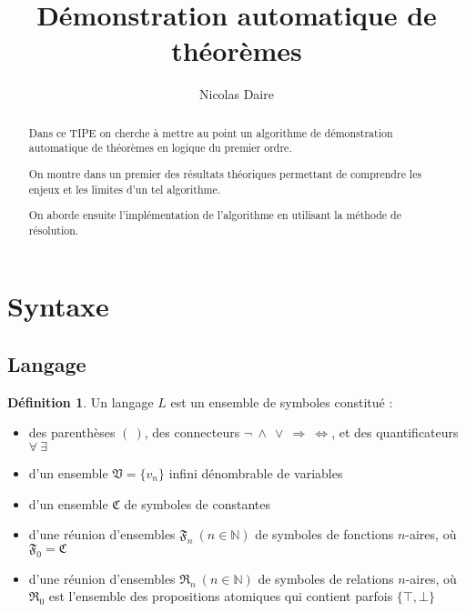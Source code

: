 \documentclass[a4paper]{article}
\title{Démonstration automatique de théorèmes}
\author{Nicolas Daire}
\date{}
\begin{document}
\maketitle

\begin{abstract}
  Dans ce TIPE on cherche à mettre au point un algorithme de démonstration automatique de théorèmes en logique du premier ordre.

  On montre dans un premier des résultats théoriques permettant de comprendre les enjeux et les limites d'un tel algorithme.

  On aborde ensuite l'implémentation de l'algorithme en utilisant la méthode de résolution.
\end{abstract}


\theoremstyle{definition}
\newtheorem{definition}{Définition}[section]

\theoremstyle{plain}
\newtheorem{theorem}{Théorème}[section]

\theoremstyle{plain}
\newtheorem{corollary}{Corollaire}[theorem]

\theoremstyle{plain}
\newtheorem{lemma}[theorem]{Lemme}

\theoremstyle{remark}
\newtheorem*{remark}{Remarque}

\section{Syntaxe}

\subsection{Langage}

\begin{definition}
  Un langage $L$ est un ensemble de symboles constitué :
  \begin{itemize}
  \item des parenthèses $(\ )$, des connecteurs $\neg\ \wedge\ \vee\ \Rightarrow\ \Leftrightarrow$, et des quantificateurs $\forall\ \exists$
  \item d'un ensemble $\mathfrak{V} = \{v_n\}$ infini dénombrable de variables
  \item d'un ensemble $\mathfrak{C}$ de symboles de constantes
  \item d'une réunion d'ensembles $\mathfrak{F}_n\ (n \in \mathbb{N})$ de symboles de fonctions $n$-aires, où $\mathfrak{F}_0 = \mathfrak{C}$
  \item d'une réunion d'ensembles $\mathfrak{R}_n\ (n \in \mathbb{N})$ de symboles de relations $n$-aires, où $\mathfrak{R}_0$ est l'ensemble des propositions atomiques qui contient parfois $\{\top,\bot\}$
  \end{itemize}
\end{definition}
\end{document}
